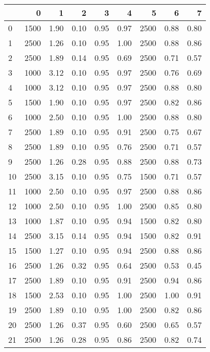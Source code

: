 \begin{tabular}{lrrrrrrrr}
\toprule
{} &     0 &     1 &     2 &     3 &     4 &     5 &     6 &     7 \\
\midrule
0  &  1500 &  1.90 &  0.10 &  0.95 &  0.97 &  2500 &  0.88 &  0.80 \\
1  &  2500 &  1.26 &  0.10 &  0.95 &  1.00 &  2500 &  0.88 &  0.86 \\
2  &  2500 &  1.89 &  0.14 &  0.95 &  0.69 &  2500 &  0.71 &  0.57 \\
3  &  1000 &  3.12 &  0.10 &  0.95 &  0.97 &  2500 &  0.76 &  0.69 \\
4  &  1000 &  3.12 &  0.10 &  0.95 &  0.97 &  2500 &  0.88 &  0.80 \\
5  &  1500 &  1.90 &  0.10 &  0.95 &  0.97 &  2500 &  0.82 &  0.86 \\
6  &  1000 &  2.50 &  0.10 &  0.95 &  1.00 &  2500 &  0.88 &  0.80 \\
7  &  2500 &  1.89 &  0.10 &  0.95 &  0.91 &  2500 &  0.75 &  0.67 \\
8  &  2500 &  1.89 &  0.10 &  0.95 &  0.76 &  2500 &  0.71 &  0.57 \\
9  &  2500 &  1.26 &  0.28 &  0.95 &  0.88 &  2500 &  0.88 &  0.73 \\
10 &  2500 &  3.15 &  0.10 &  0.95 &  0.75 &  1500 &  0.71 &  0.57 \\
11 &  1000 &  2.50 &  0.10 &  0.95 &  0.97 &  2500 &  0.88 &  0.86 \\
12 &  1000 &  2.50 &  0.10 &  0.95 &  1.00 &  2500 &  0.85 &  0.80 \\
13 &  1000 &  1.87 &  0.10 &  0.95 &  0.94 &  1500 &  0.82 &  0.80 \\
14 &  2500 &  3.15 &  0.14 &  0.95 &  0.94 &  1500 &  0.82 &  0.91 \\
15 &  1500 &  1.27 &  0.10 &  0.95 &  0.94 &  2500 &  0.88 &  0.86 \\
16 &  2500 &  1.26 &  0.32 &  0.95 &  0.64 &  2500 &  0.53 &  0.45 \\
17 &  2500 &  1.89 &  0.10 &  0.95 &  0.91 &  2500 &  0.94 &  0.86 \\
18 &  1500 &  2.53 &  0.10 &  0.95 &  1.00 &  2500 &  1.00 &  0.91 \\
19 &  2500 &  1.89 &  0.10 &  0.95 &  1.00 &  2500 &  0.82 &  0.86 \\
20 &  2500 &  1.26 &  0.37 &  0.95 &  0.60 &  2500 &  0.65 &  0.57 \\
21 &  2500 &  1.26 &  0.28 &  0.95 &  0.86 &  2500 &  0.82 &  0.74 \\

\end{tabular}
